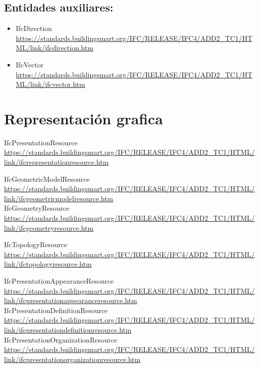 \documentclass[spanish,12pt,a4paper,final,oneside]{book}
\begin{document}
\subsection{Entidades auxiliares:}
\begin{itemize}
\item IfcDirection
\\ \url{https://standards.buildingsmart.org/IFC/RELEASE/IFC4/ADD2_TC1/HTML/link/ifcdirection.htm}
\item IfcVector
\\ \url{https://standards.buildingsmart.org/IFC/RELEASE/IFC4/ADD2_TC1/HTML/link/ifcvector.htm}
\end{itemize}



\section{Representación grafica}
IfcPresentationResource
\\ \url{https://standards.buildingsmart.org/IFC/RELEASE/IFC4/ADD2_TC1/HTML/link/ifcrepresentationresource.htm}

\vspace{0.5cm}

IfcGeometricModelResource
\\ \url{https://standards.buildingsmart.org/IFC/RELEASE/IFC4/ADD2_TC1/HTML/link/ifcgeometricmodelresource.htm}
\\IfcGeometryResource
\\ \url{https://standards.buildingsmart.org/IFC/RELEASE/IFC4/ADD2_TC1/HTML/link/ifcgeometryresource.htm}

\vspace{0.5cm}

IfcTopologyResource
\\ \url{https://standards.buildingsmart.org/IFC/RELEASE/IFC4/ADD2_TC1/HTML/link/ifctopologyresource.htm}

\vspace{0.5cm}

IfcPresentationAppearanceResource
\\ \url{https://standards.buildingsmart.org/IFC/RELEASE/IFC4/ADD2_TC1/HTML/link/ifcpresentationappearanceresource.htm}
\\IfcPresentationDefinitionResource
\\ \url{https://standards.buildingsmart.org/IFC/RELEASE/IFC4/ADD2_TC1/HTML/link/ifcpresentationdefinitionresource.htm}
\\IfcPresentationOrganizationResource
\\ \url{https://standards.buildingsmart.org/IFC/RELEASE/IFC4/ADD2_TC1/HTML/link/ifcpresentationorganizationresource.htm}
\end{document}
